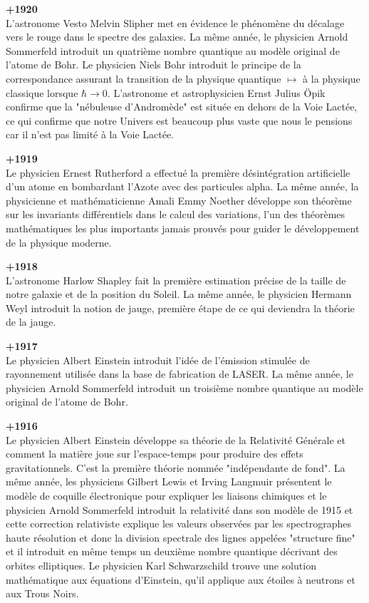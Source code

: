 \textbf{+1920}\\
L'astronome Vesto Melvin Slipher met en évidence le phénomène du décalage vers le rouge dans le spectre des galaxies. La même année, le physicien Arnold Sommerfeld introduit un quatrième nombre quantique au modèle original de l'atome de Bohr. Le physicien Niels Bohr introduit le principe de la correspondance assurant la transition de la physique quantique $\mapsto$ à la physique classique lorsque $\hbar \rightarrow 0$. L'astronome et astrophysicien Ernst Julius Öpik confirme que la "nébuleuse d'Andromède" est située en dehors de la Voie Lactée, ce qui confirme que notre Univers est beaucoup plus vaste que nous le pensions car il n'est pas limité à la Voie Lactée.

\textbf{+1919}\\
Le physicien Ernest Rutherford a effectué la première désintégration artificielle d'un atome en bombardant l'Azote avec des particules alpha. La même année, la physicienne et mathématicienne Amali Emmy Noether développe son théorème sur les invariants différentiels dans le calcul des variations, l'un des théorèmes mathématiques les plus importants jamais prouvés pour guider le développement de la physique moderne.

\textbf{+1918}\\
L'astronome Harlow Shapley fait la première estimation précise de la taille de notre galaxie et de la position du Soleil. La même année, le physicien Hermann Weyl introduit la notion de jauge, première étape de ce qui deviendra la théorie de la jauge.

\textbf{+1917}\\
Le physicien Albert Einstein introduit l'idée de l'émission stimulée de rayonnement utilisée dans la base de fabrication de LASER. La même année, le physicien Arnold Sommerfeld introduit un troisième nombre quantique au modèle original de l'atome de Bohr.

\textbf{+1916}\\
Le physicien Albert Einstein développe sa théorie de la Relativité Générale et comment la matière joue sur l'espace-temps pour produire des effets gravitationnels. C'est la première théorie nommée "indépendante de fond". La même année, les physiciens Gilbert Lewis et Irving Langmuir présentent le modèle de coquille électronique pour expliquer les liaisons chimiques et le physicien Arnold Sommerfeld introduit la relativité dans son modèle de 1915 et cette correction relativiste explique les valeurs observées par les spectrographes haute résolution et donc la division spectrale des lignes appelées "structure fine" et il introduit en même temps un deuxième nombre quantique décrivant des orbites elliptiques. Le physicien Karl Schwarzschild trouve une solution mathématique aux équations d'Einstein, qu'il applique aux étoiles à neutrons et aux Trous Noirs.

